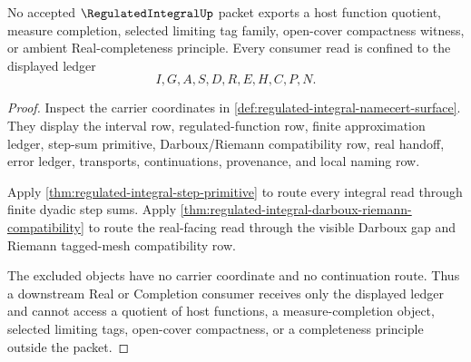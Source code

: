 \begin{theorem}
\label{thm:regulated-integral-nonescape}
No accepted $\RegulatedIntegralUp$ packet exports a host function quotient, measure completion, selected limiting tag family, open-cover compactness witness, or ambient Real-completeness principle. Every consumer read is confined to the displayed ledger
$$
I,G,A,S,D,R,E,H,C,P,N .
$$
\end{theorem}
\begin{proof}
Inspect the carrier coordinates in \autoref{def:regulated-integral-namecert-surface}. They display the interval row, regulated-function row, finite approximation ledger, step-sum primitive, Darboux/Riemann compatibility row, real handoff, error ledger, transports, continuations, provenance, and local naming row.

Apply \autoref{thm:regulated-integral-step-primitive} to route every integral read through finite dyadic step sums. Apply \autoref{thm:regulated-integral-darboux-riemann-compatibility} to route the real-facing read through the visible Darboux gap and Riemann tagged-mesh compatibility row.

The excluded objects have no carrier coordinate and no continuation route. Thus a downstream Real or Completion consumer receives only the displayed ledger and cannot access a quotient of host functions, a measure-completion object, selected limiting tags, open-cover compactness, or a completeness principle outside the packet.
\end{proof}

